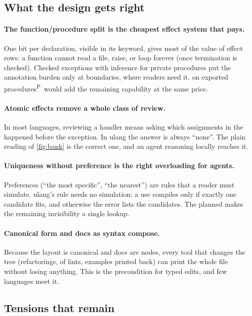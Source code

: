 \documentclass[11pt,a4paper]{article}
\newcommand{\code}[1]{\texttt{\detokenize{#1}}}
\newcommand{\planned}{\textsuperscript{\textsf{\scriptsize P}}}
\begin{document}
\subsection{What the design gets right}

\paragraph{The function/procedure split is the cheapest effect system that pays.}
One bit per declaration, visible in its keyword, gives most of the value of effect rows: a
function cannot read a file, raise, or loop forever (once termination is checked). Checked
exceptions with inference for private procedures put the annotation burden only at
boundaries, where readers need it. \code{uses os} on exported procedures\planned\ would add
the remaining capability at the same price.

\paragraph{Atomic effects remove a whole class of review.}
In most languages, reviewing a handler means asking which assignments in the \code{try}
happened before the exception. In ulang the answer is always ``none''. The plain reading of
\cref{fig:bank} is the correct one, and an agent reasoning locally reaches it.

\paragraph{Uniqueness without preference is the right overloading for agents.}
Preferences (``the most specific'', ``the nearest'') are rules that a reader must simulate.
ulang's rule needs no simulation: a use compiles only if exactly one candidate fits, and
otherwise the error lists the candidates. The planned \code{resolve} makes the remaining
invisibility a single lookup.

\paragraph{Canonical form and docs as syntax compose.}
Because the layout is canonical and docs are nodes, every tool that changes the tree
(refactorings, \code{--apply} of lints, examples printed back) can print the whole file
without losing anything. This is the precondition for typed edits, and few languages meet it.

\subsection{Tensions that remain}
\end{document}

